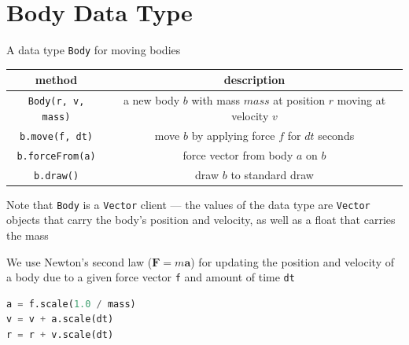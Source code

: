 \documentclass[8pt,a4paper,compress]{beamer}
\begin{document}
\section{Body Data Type}
\begin{frame}[fragile]
\pause

A data type \lstinline{Body} for moving bodies
\begin{center}
\begin{tabular}{cc}
method & description \\ \hline
\lstinline$Body(r, v, mass)$ & a new body $b$ with mass $mass$ at position $r$ moving at velocity $v$ \\
\lstinline$b.move(f, dt)$ & move $b$ by applying force $f$ for $dt$ seconds \\
\lstinline$b.forceFrom(a)$ & force vector from body $a$ on $b$ \\
\lstinline$b.draw()$ & draw $b$ to standard draw
\end{tabular} 
\end{center}

\pause
\bigskip

Note that \lstinline{Body} is a \lstinline{Vector} client --- the values of the data type are \lstinline{Vector} objects that carry the body's position and velocity, as well as a float that carries the mass

\pause
\bigskip

We use Newton's second law ($\mathbf{F}=m\mathbf{a}$) for updating the position and velocity of a body due to a given force vector \lstinline{f} and amount of time \lstinline{dt}
\begin{lstlisting}[language=Python]
a = f.scale(1.0 / mass)
v = v + a.scale(dt)
r = r + v.scale(dt)
\end{lstlisting}

\begin{center}
\end{center}
\end{frame}
\end{document}

